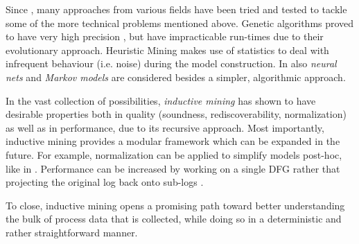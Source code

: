 \documentclass[a4paper]{IEEEtran}
\begin{document}
Since \cite{processessoftware}, many approaches from various fields have been tried and tested to tackle some of the more technical problems mentioned above. Genetic algorithms proved to have very high precision \cite{van2011geneticsoundness}, but have impracticable run-times due to their evolutionary approach. Heuristic Mining makes use of statistics to deal with infrequent behaviour (i.e. noise) during the model construction. In \cite{processessoftware} also \textit{neural nets} and \textit{Markov models} are considered besides a simpler, algorithmic approach. 

In the vast collection of possibilities, \textit{inductive mining} has shown to have desirable properties both in quality (soundness, rediscoverability, normalization) as well as in performance, due to its recursive approach.
Most importantly, inductive mining provides a modular framework which can be expanded in the future. For example, normalization can be applied to simplify models post-hoc, like in \cite{fahland2013simplifying}. Performance can be increased by working on a single DFG rather that projecting the original log back onto sub-logs \cite{leemans2015scalable, evermann2016scalable}. 

To close, inductive mining opens a promising path toward better understanding the bulk of process data that is collected, while doing so in a deterministic and rather straightforward manner. 

 

\end{document}
